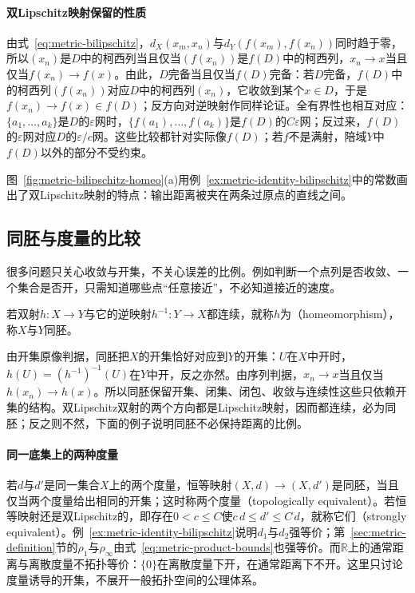 \paragraph{双Lipschitz映射保留的性质}
由式~\eqref{eq:metric-bilipschitz}，$d_X(x_m,x_n)$与$d_Y(f(x_m),f(x_n))$同时趋于零，所以$(x_n)$是$D$中的柯西列当且仅当$(f(x_n))$是$f(D)$中的柯西列，$x_n\to x$当且仅当$f(x_n)\to f(x)$。由此，$D$完备当且仅当$f(D)$完备：若$D$完备，$f(D)$中的柯西列$(f(x_n))$对应$D$中的柯西列$(x_n)$，它收敛到某个$x\in D$，于是$f(x_n)\to f(x)\in f(D)$；反方向对逆映射作同样论证。全有界性也相互对应：$\{a_1,\dots,a_k\}$是$D$的$\varepsilon$网时，$\{f(a_1),\dots,f(a_k)\}$是$f(D)$的$C\varepsilon$网；反过来，$f(D)$的$\varepsilon$网对应$D$的$\varepsilon/c$网。这些比较都针对实际像$f(D)$；若$f$不是满射，陪域$Y$中$f(D)$以外的部分不受约束。

图~\ref{fig:metric-bilipschitz-homeo}(a)用例~\ref{ex:metric-identity-bilipschitz}中的常数画出了双Lipschitz映射的特点：输出距离被夹在两条过原点的直线之间。

\subsection{同胚与度量的比较}
\label{sec:metric-homeomorphism}

很多问题只关心收敛与开集，不关心误差的比例。例如判断一个点列是否收敛、一个集合是否开，只需知道哪些点“任意接近”，不必知道接近的速度。

\begin{definition}[同胚]
\label{def:metric-homeomorphism}
若双射$h:X\to Y$与它的逆映射$h^{-1}:Y\to X$都连续，就称$h$为（homeomorphism），称$X$与$Y$同胚。
\end{definition}

由开集原像判据，同胚把$X$的开集恰好对应到$Y$的开集：$U$在$X$中开时，$h(U)=(h^{-1})^{-1}(U)$在$Y$中开，反之亦然。由序列判据，$x_n\to x$当且仅当$h(x_n)\to h(x)$。所以同胚保留开集、闭集、闭包、收敛与连续性这些只依赖开集的结构。双Lipschitz双射的两个方向都是Lipschitz映射，因而都连续，必为同胚；反之则不然，下面的例子说明同胚不必保持距离的比例。

\paragraph{同一底集上的两种度量}
若$d$与$d'$是同一集合$X$上的两个度量，恒等映射$(X,d)\to(X,d')$是同胚，当且仅当两个度量给出相同的开集；这时称两个度量（topologically equivalent）。若恒等映射还是双Lipschitz的，即存在$0<c\leq C$使$c\,d\leq d'\leq C\,d$，就称它们（strongly equivalent）。例~\ref{ex:metric-identity-bilipschitz}说明$d_1$与$d_2$强等价；第~\ref{sec:metric-definition}节的$\rho_1$与$\rho_\infty$由式~\eqref{eq:metric-product-bounds}也强等价。而$\mathbb R$上的通常距离与离散度量不拓扑等价：$\{0\}$在离散度量下开，在通常距离下不开。这里只讨论度量诱导的开集，不展开一般拓扑空间的公理体系。

